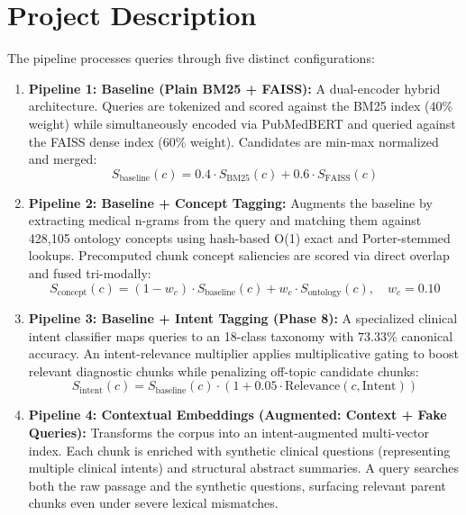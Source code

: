 \documentclass[11pt,a4paper]{article}
\begin{document}
\section{Project Description}
The pipeline processes queries through five distinct configurations:
\begin{enumerate}[leftmargin=1.8em, itemsep=0.3em]
    \item \textbf{Pipeline 1: Baseline (Plain BM25 + FAISS):}
    A dual-encoder hybrid architecture. Queries are tokenized and scored against the BM25 index ($40\%$ weight) while simultaneously encoded via PubMedBERT and queried against the FAISS dense index ($60\%$ weight). Candidates are min-max normalized and merged:
    \begin{equation}
        S_{\text{baseline}}(c) = 0.4 \cdot S_{\text{BM25}}(c) + 0.6 \cdot S_{\text{FAISS}}(c)
    \end{equation}

    \item \textbf{Pipeline 2: Baseline + Concept Tagging:}
    Augments the baseline by extracting medical n-grams from the query and matching them against 428,105 ontology concepts using hash-based O(1) exact and Porter-stemmed lookups. Precomputed chunk concept saliencies are scored via direct overlap and fused tri-modally:
    \begin{equation}
        S_{\text{concept}}(c) = (1 - w_c) \cdot S_{\text{baseline}}(c) + w_c \cdot S_{\text{ontology}}(c), \quad w_c = 0.10
    \end{equation}

    \item \textbf{Pipeline 3: Baseline + Intent Tagging (Phase 8):}
    A specialized clinical intent classifier maps queries to an 18-class taxonomy with $73.33\%$ canonical accuracy. An intent-relevance multiplier applies multiplicative gating to boost relevant diagnostic chunks while penalizing off-topic candidate chunks:
    \begin{equation}
        S_{\text{intent}}(c) = S_{\text{baseline}}(c) \cdot \left(1 + 0.05 \cdot \text{Relevance}(c, \text{Intent})\right)
    \end{equation}

    \item \textbf{Pipeline 4: Contextual Embeddings (Augmented: Context + Fake Queries):}
    Transforms the corpus into an intent-augmented multi-vector index. Each chunk is enriched with synthetic clinical questions (representing multiple clinical intents) and structural abstract summaries. A query searches both the raw passage and the synthetic questions, surfacing relevant parent chunks even under severe lexical mismatches.


\end{enumerate}
\end{document}
